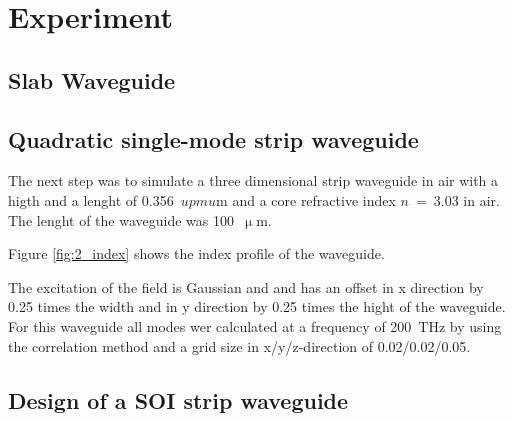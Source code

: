 \chapter{Experiment}
\section{Slab Waveguide}



\section{Quadratic single-mode strip waveguide}
\label{sec:task2}

The next step was to simulate a three dimensional strip waveguide in air with a higth and a lenght of 0.356~$upmu$m and a core refractive index $n$~=~3.03 in air.
The lenght of the waveguide was 100~$\upmu$m.

Figure \ref{fig:2_index} shows the index profile of the waveguide.
% 

The excitation of the field is Gaussian and and has an offset in x direction by 0.25 times the width and in y direction by 0.25 times the hight of the waveguide.
For this waveguide all modes wer calculated at a frequency of 200~THz by using the correlation method and a grid size in x/y/z-direction of 0.02/0.02/0.05. 


% 




\section{Design of a SOI strip waveguide}

